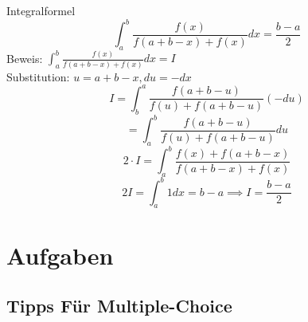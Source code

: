 \documentclass[a4paper,fontsize = 7pt]{scrartcl}
\begin{document}
\begin{mainbox}{Integralformel}
  \vspace{-12pt}
  $$\int_a^b \frac{f(x)}{f(a+b-x)+f(x)}dx = \frac{b-a}{2}$$
  Beweis: 
  $\int_a^b \frac{f(x)}{f(a+b-x)+f(x)}dx = I$
  \\Substitution: $u = a + b -x, du = -dx$
  $$I = \int_b^a \frac{f(a+b-u)}{f(u)+f(a+b-u)}(-du) $$
  $$= \int_a^b \frac{f(a+b-u)}{f(u)+f(a+b-u)}du$$
  $$2 \cdot I = \int_a^b \frac{f(x)+f(a+b-x)}{f(a+b-x)+f(x)}$$
  $$2I = \int_a^b1dx = b-a \implies I = \frac{b-a}{2}$$
\end{mainbox}

\section{Aufgaben}
\subsection{Tipps Für Multiple-Choice}%
\end{document}
